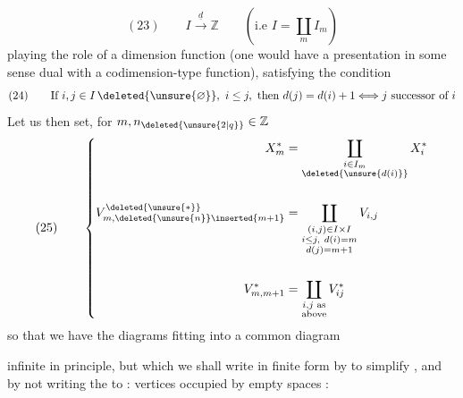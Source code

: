 \[
(23)\qquad I\xrightarrow{\underline{d}}\mathbb Z
\qquad (\text{i.e } I=\coprod_m I_m)
\]
playing the role of a dimension function
(one would have a presentation in some sense
dual with a codimension-type function),
satisfying the condition
\[
(24)\qquad\text{If }i,j\in I\,\deleted{\unsure{\varnothing}},\ i\leq j,\text{ then }d(j)=d(i)+1\Longleftrightarrow j\text{ successor of }i
\]
Let us then set, for $m,n_{\deleted{\unsure{2|q}}}\in\mathbb Z$
\[
(25)\qquad\left\{\begin{aligned}
X_m^*&=\coprod_{\substack{i\in I_m\\\deleted{\unsure{d(i)}}}}X_i^*\\[1.5em]
V_{m,\deleted{\unsure{n}}\inserted{m+1}}^{\deleted{\unsure{*}}}&=\coprod_{\substack{(i,j)\in I\times I\\i\leq j,\ d(i)=m\\d(j)=m+1}}V_{i,j}\\[1.5em]
V_{m,m+1}^*&=\coprod_{\substack{i,j\text{ as}\\\text{above}}}V_{ij}^*
\end{aligned}\right.
\]
so that we have the diagrams
fitting into a common diagram %

infinite in principle, but which we
shall write in finite form by 
to simplify ,  and by not writing the
   to :
vertices occupied by empty spaces :
